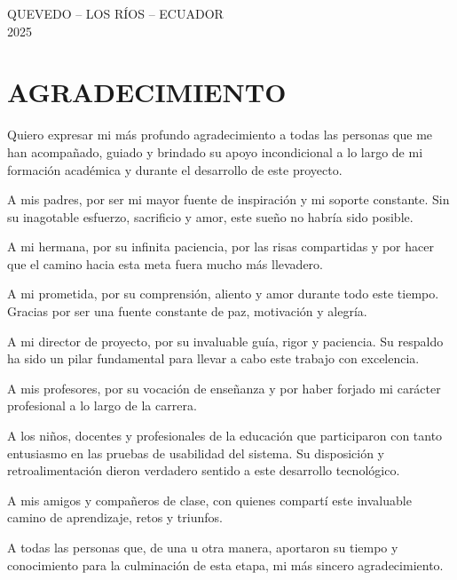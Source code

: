 \documentclass[12pt,a4paper,oneside]{report}
\begin{document}
\vspace{2cm}

\begin{center}
QUEVEDO -- LOS RÍOS -- ECUADOR\\
2025
\end{center}

\clearpage

\chapter*{AGRADECIMIENTO}

\begin{center}
\begin{minipage}{0.85\textwidth}
\centering

Quiero expresar mi más profundo agradecimiento a todas las personas que me han acompañado, guiado y brindado su apoyo incondicional a lo largo de mi formación académica y durante el desarrollo de este proyecto.

A mis padres, por ser mi mayor fuente de inspiración y mi soporte constante. Sin su inagotable esfuerzo, sacrificio y amor, este sueño no habría sido posible.

A mi hermana, por su infinita paciencia, por las risas compartidas y por hacer que el camino hacia esta meta fuera mucho más llevadero.

A mi prometida, por su comprensión, aliento y amor durante todo este tiempo. Gracias por ser una fuente constante de paz, motivación y alegría.

A mi director de proyecto, por su invaluable guía, rigor y paciencia. Su respaldo ha sido un pilar fundamental para llevar a cabo este trabajo con excelencia.

A mis profesores, por su vocación de enseñanza y por haber forjado mi carácter profesional a lo largo de la carrera.

A los niños, docentes y profesionales de la educación que participaron con tanto entusiasmo en las pruebas de usabilidad del sistema. Su disposición y retroalimentación dieron verdadero sentido a este desarrollo tecnológico.

A mis amigos y compañeros de clase, con quienes compartí este invaluable camino de aprendizaje, retos y triunfos.

A todas las personas que, de una u otra manera, aportaron su tiempo y conocimiento para la culminación de esta etapa, mi más sincero agradecimiento.

\end{minipage}
\end{center}
\end{document}
